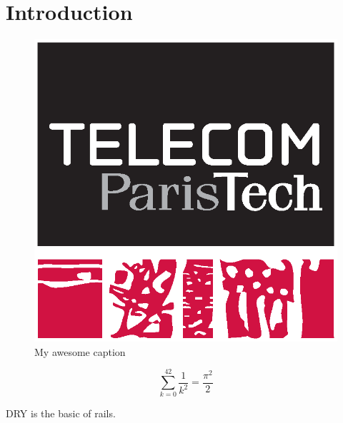 \chapter{Introduction} %
\label{cha:introduction}

\begin{figure}
\centering
\includegraphics[scale=.5]{img/logos/telecom.eps}
\caption{My awesome caption}	
\end{figure}


$$\sum_{k=0}^{42} \frac{1}{k^2} = \frac{\pi^2}{2} $$


\ac{DRY} is the basic of rails.
